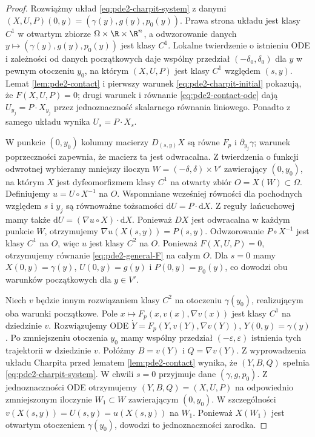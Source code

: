 \begin{proof}
Rozwiążmy układ \eqref{eq:pde2-charpit-system}
z danymi $(X,U,P)(0,y)=(\gamma(y),g(y),p_0(y))$.
Prawa strona układu jest klasy $C^1$ w otwartym
zbiorze $\Omega\times\R\times\R^n$, a odwzorowanie
danych $y\mapsto(\gamma(y),g(y),p_0(y))$ jest klasy $C^1$.
Lokalne twierdzenie o istnieniu ODE i zależności od
danych początkowych daje wspólny przedział
$(-\delta_0,\delta_0)$ dla $y$ w pewnym otoczeniu $y_0$,
na którym $(X,U,P)$ jest klasy $C^1$ względem $(s,y)$.
Lemat \ref{lem:pde2-contact} i pierwszy warunek
\eqref{eq:pde2-charpit-initial} pokazują, że
$F(X,U,P)=0$; drugi warunek i równanie
\eqref{eq:pde2-contact-ode} dają
$U_{y_j}=P\cdot X_{y_j}$ przez jednoznaczność
skalarnego równania liniowego. Ponadto z samego
układu wynika $U_s=P\cdot X_s$.

W punkcie $(0,y_0)$ kolumny macierzy $D_{(s,y)}X$
są równe $F_p$ i $\partial_{y_j}\gamma$;
warunek poprzeczności zapewnia, że macierz ta jest
odwracalna. Z twierdzenia o funkcji odwrotnej wybieramy
mniejszy iloczyn $W=(-\delta,\delta)\times V'$
zawierający $(0,y_0)$, na którym $X$ jest
dyfeomorfizmem klasy $C^1$ na otwarty zbiór
$O=X(W)\subset\Omega$.
Definiujemy $u=U\circ X^{-1}$ na $O$.
Wspomniane wcześniej równości dla pochodnych
względem $s$ i $y_j$ są równoważne tożsamości
$\mathrm dU=P\cdot\mathrm dX$.
Z reguły łańcuchowej mamy także
$\mathrm dU=(\nabla u\circ X)\cdot\mathrm dX$.
Ponieważ $DX$ jest odwracalna w każdym punkcie $W$,
otrzymujemy $\nabla u(X(s,y))=P(s,y)$.
Odwzorowanie $P\circ X^{-1}$ jest klasy $C^1$ na $O$,
więc $u$ jest klasy $C^2$ na $O$.
Ponieważ $F(X,U,P)=0$, otrzymujemy równanie
\eqref{eq:pde2-general-F} na całym $O$.
Dla $s=0$ mamy $X(0,y)=\gamma(y)$,
$U(0,y)=g(y)$ i $P(0,y)=p_0(y)$, co dowodzi
obu warunków początkowych dla $y\in V'$.

Niech $v$ będzie innym rozwiązaniem klasy $C^2$
na otoczeniu $\gamma(y_0)$, realizującym oba warunki
początkowe. Pole $x\mapsto F_p(x,v(x),\nabla v(x))$
jest klasy $C^1$ na dziedzinie $v$. Rozwiązujemy ODE
$\dot Y=F_p(Y,v(Y),\nabla v(Y))$, $Y(0,y)=\gamma(y)$.
Po zmniejszeniu otoczenia $y_0$ mamy wspólny przedział
$(-\varepsilon,\varepsilon)$ istnienia tych trajektorii
w dziedzinie $v$. Połóżmy $B=v(Y)$ i $Q=\nabla v(Y)$.
Z wyprowadzenia układu Charpita przed lematem
\ref{lem:pde2-contact} wynika, że $(Y,B,Q)$ spełnia
\eqref{eq:pde2-charpit-system}.
W chwili $s=0$ przyjmuje dane $(\gamma,g,p_0)$.
Z jednoznaczności ODE otrzymujemy
$(Y,B,Q)=(X,U,P)$ na odpowiednio zmniejszonym iloczynie
$W_1\subset W$ zawierającym $(0,y_0)$.
W szczególności $v(X(s,y))=U(s,y)=u(X(s,y))$
na $W_1$. Ponieważ $X(W_1)$ jest otwartym otoczeniem
$\gamma(y_0)$, dowodzi to jednoznaczności zarodka.
\end{proof}

